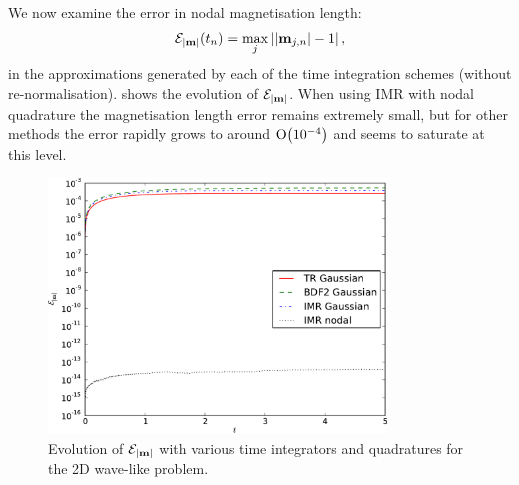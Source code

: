 We now examine the error in nodal magnetisation length:
\begin{equation}
  \mathcal{E}_{\left|{\boldsymbol{\mathrm{m}}} \right|}(t_n) = \max_j \left|{\left|{\boldsymbol{\mathrm{m}}_{j,n}} \right| - 1} \right|,
  \label{eq:102}
\end{equation}
in the approximations generated by each of the time integration schemes (without re-normalisation).
 shows the evolution of $\mathcal{E}_{\left|{\boldsymbol{\mathrm{m}}} \right|}$.
When using IMR with nodal quadrature the magnetisation length error remains extremely small, but for other methods the error rapidly grows to around $\mathrm{O}{\left( 10^{-4} \right)}$ and seems to saturate at this level.
\begin{figure}
  \centering
  \includegraphics[width=0.8\textwidth]
  {plots/2d_wave_solution_m_length/mlengtherrormaxesvstimes.pdf}
  \caption{Evolution of $\mathcal{E}_{\left|{\boldsymbol{\mathrm{m}}} \right|}$ with various time integrators and quadratures for the 2D wave-like problem.
  }
  \label{fig:mean-ml-error-2d}
\end{figure}

